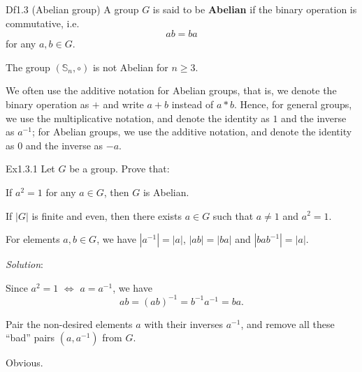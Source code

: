 \documentclass{article}
\begin{document}
\begin{Df}{Df1.3 (Abelian group)}
    A group $G$ is said to be \textbf{Abelian} if the binary operation is commutative, i.e. 
    $$ ab = ba $$
    for any $a, b\in G$.
\end{Df}

\begin{Rmk}{}
    \begin{compactenum}
        \item \textcolor{Th}{The group $(\mathbb{S}_n, \circ)$ is not Abelian for $n\geq 3$.}
        \item \textcolor{Df}{We often use the additive notation for Abelian groups, that is, we denote the binary operation as $+$ and write $a+b$ instead of $a\ast b$. Hence, for general groups, we use the multiplicative notation, and denote the identity as $1$ and the inverse as $a^{-1}$; for Abelian groups, we use the additive notation, and denote the identity as $0$ and the inverse as $-a$.}
    \end{compactenum}
\end{Rmk}

\begin{Th}{Ex1.3.1}
    Let $G$ be a group. Prove that:
    \begin{compactenum}
        \item If $a^2=1$ for any $a\in G$, then $G$ is Abelian.
        \item If $|G|$ is finite and even, then there exists $a\in G$ such that $a\neq 1$ and $a^2=1$.
        \item For elements $a, b\in G$, we have $|a^{-1}| = |a|$, $|ab| = |ba|$ and $|bab^{-1}| = |a|$.
    \end{compactenum}
    \tcblower
    \textit{Solution}:
    \begin{compactenum}
        \item Since $a^2=1$ $\Leftrightarrow$ $a=a^{-1}$, we have
        $$ ab = (ab)^{-1} = b^{-1}a^{-1} = ba. $$
        \item Pair the non-desired elements $a$ with their inverses $a^{-1}$, and remove all these ``bad'' pairs $(a, a^{-1})$ from $G$.
        \item Obvious. 
    \end{compactenum}
\end{Th}
\end{document}
